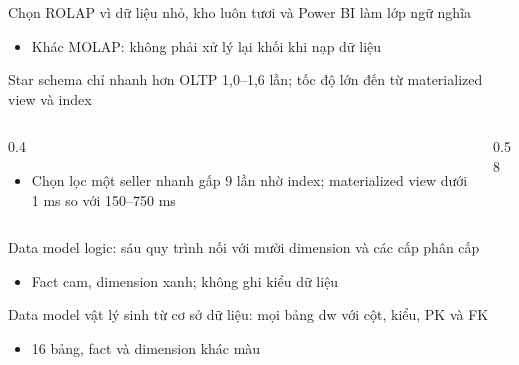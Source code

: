 \begin{frame}{Chọn ROLAP vì dữ liệu nhỏ, kho luôn tươi và Power BI làm lớp ngữ nghĩa}
\begin{itemize}
  \item Khác MOLAP: không phải xử lý lại khối khi nạp dữ liệu
\end{itemize}

\end{frame}

\begin{frame}{Star schema chỉ nhanh hơn OLTP 1,0–1,6 lần; tốc độ lớn đến từ materialized view và index}
\begin{columns}[T]\begin{column}{0.4\textwidth}
\begin{itemize}
  \item Chọn lọc một seller nhanh gấp 9 lần nhờ index; materialized view dưới 1 ms so với 150–750 ms
\end{itemize}
\end{column}\begin{column}{0.58\textwidth}
\begin{center}\end{center}
\end{column}\end{columns}

\end{frame}

\begin{frame}{Data model logic: sáu quy trình nối với mười dimension và các cấp phân cấp}
\begin{itemize}
  \item Fact cam, dimension xanh; không ghi kiểu dữ liệu
\end{itemize}
\begin{center}\end{center}

\end{frame}

\begin{frame}{Data model vật lý sinh từ cơ sở dữ liệu: mọi bảng dw với cột, kiểu, PK và FK}
\begin{itemize}
  \item 16 bảng, fact và dimension khác màu
\end{itemize}
\begin{center}\end{center}

\end{frame}


